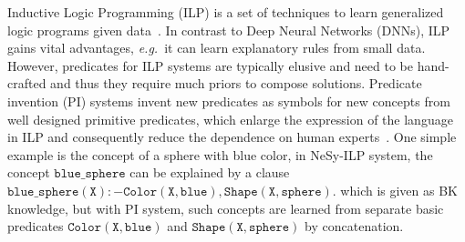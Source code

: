 \documentclass[
]{ceurart}
\newcommand{\eg}{\emph{e.g.}~}
\begin{document}
	
	
	Inductive Logic Programming (ILP) is a set of techniques to learn generalized logic programs given data~\cite{Muggleton91,Nienhuys97,Cropper20}.
	In contrast to Deep Neural Networks (DNNs), ILP gains vital advantages, \eg it can learn explanatory rules from small data.
	However, predicates for ILP systems are typically elusive and need to be hand-crafted and thus they require much priors to compose solutions.
	Predicate invention (PI) systems invent new predicates as symbols for new concepts from well designed primitive predicates, which enlarge the expression of the language in ILP and consequently reduce the dependence on human experts~\cite{pi1988}. 
	One simple example is the concept of a sphere with blue color, in NeSy-ILP system, the concept $ \mathtt{blue\_sphere} $ can be explained by a clause $\mathtt{blue\_sphere(X):-Color(X,blue),Shape(X,sphere).} $ which is given as BK knowledge, but with PI system, such concepts are learned from separate basic predicates $ \mathtt{Color(X,blue)} $ and $ \mathtt{Shape(X,sphere)} $ by concatenation. 
	
	
	
	
	
\end{document}
